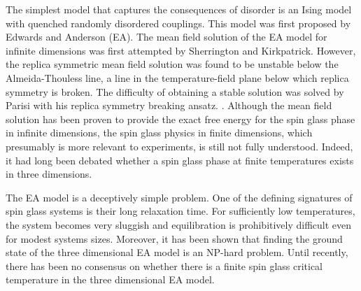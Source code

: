 The simplest model that captures the consequences of disorder is an Ising model 
with quenched randomly disordered couplings. This model was first proposed by 
Edwards and Anderson (EA). \cite{Edwards-Anderson1975} The mean field solution 
of the EA model for infinite dimensions was first attempted by Sherrington and 
Kirkpatrick. \cite{Sherrington-Kirkpatrick1978} However, the replica symmetric 
mean field solution was found to be unstable below the Almeida-Thouless line, 
\cite{Almedia-Thouless1978,Bray-Moore-1978} a line in the temperature-field 
plane below which replica symmetry is broken. The difficulty of obtaining a 
stable solution was solved by Parisi with his replica symmetry breaking ansatz. 
\cite{Parisi1980}.
Although the mean field solution has been proven to 
provide the exact free energy for the spin glass phase in infinite dimensions, 
\cite{Talagrand-2006,Guerra-2003} the spin glass physics in finite dimensions, 
which presumably is more relevant to experiments, is still not fully understood.
 Indeed, it had long been debated whether a spin glass 
phase at finite temperatures exists in three dimensions.

The EA model is a deceptively simple problem. %
One of the defining signatures of spin glass systems is their long relaxation 
time. 
For sufficiently low temperatures, the system becomes very sluggish and 
equilibration is prohibitively difficult even for modest systems sizes. 
Moreover, it has been shown that finding the ground state of the three 
dimensional EA model is an NP-hard problem. \cite{Barahona-1982} 
Until recently, there has been no consensus on whether there is a finite spin 
glass critical temperature in the three dimensional EA model.

